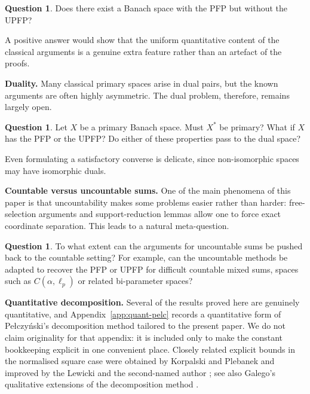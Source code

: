 \documentclass[11pt]{amsart}
\newcommand{\runinhead}[1]{%
  \par\medskip\noindent\textbf{#1.}\enspace\ignorespaces
}
\theoremstyle{plain}
\theoremstyle{definition}
\newtheorem{question}[theorem]{Question}
\numberwithin{equation}{section}
\begin{document}
\begin{question}
Does there exist a Banach space with the PFP but without the UPFP?
\end{question}

A positive answer would show that the uniform quantitative content of the classical arguments is a genuine extra feature rather than an artefact of the proofs.

\runinhead{Duality} Many classical primary spaces arise in dual pairs, but the known arguments are often highly asymmetric.
The dual problem, therefore, remains largely open.

\begin{question}
Let $X$ be a primary Banach space. Must $X^*$ be primary?
What if $X$ has the PFP or the UPFP?
Do either of these properties pass to the dual space?
\end{question}

Even formulating a satisfactory converse is delicate, since non-isomorphic spaces may have isomorphic duals.

\runinhead{Countable versus uncountable sums} One of the main phenomena of this paper is that uncountability makes some problems easier rather than harder:
free-selection arguments and support-reduction lemmas allow one to force exact coordinate separation.
This leads to a natural meta-question.

\begin{question}
To what extent can the arguments for uncountable sums be pushed back to the countable setting?
For example, can the uncountable methods be adapted to recover the PFP or UPFP for difficult countable mixed sums, spaces such as $C(\alpha,\ell_p)$ or related bi-parameter spaces?
\end{question}

\runinhead{Quantitative decomposition} Several of the results proved here are genuinely quantitative, and Appendix~\ref{app:quant-pelc} records a quantitative form of Pe{\l}czy\'nski's decomposition method tailored to the present paper. We do not claim originality for that appendix: it is included only to make the constant bookkeeping explicit in one convenient place. Closely related explicit bounds in the normalised square case were obtained by Korpalski and Plebanek \cite[Theorem~5.1]{KorpalskiPlebanek2025} and improved by the Lewicki and the second-named author \cite[Theorem~B; Theorem~5.1]{KaniaLewicki2026}; see also Galego's qualitative extensions of the decomposition method \cite{Galego2007,Galego2008}.
\end{document}
